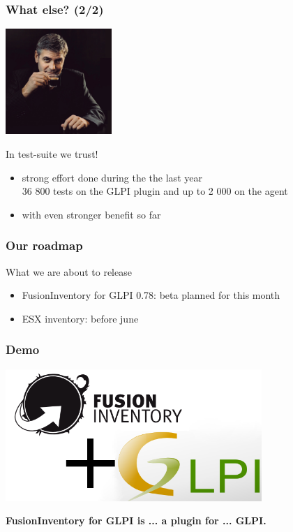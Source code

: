 \documentclass{beamer}
\begin{document}
\begin{frame}
    \frametitle{What else? (2/2)}

    \begin{center}
    \includegraphics[height=4.0cm]{pics/whatelse.jpg}
    \end{center}

    \begin{block}{In test-suite we trust!}
        \begin{itemize}
            \item strong effort done during the the last year \\
            \small{36 800 tests on the GLPI plugin and up to 2 000 on the agent}
            \item with even stronger benefit so far
        \end{itemize}
    \end{block}
\end{frame}

\begin{frame}
    \frametitle{Our roadmap}

    What we are about to release
    \begin{itemize}
    \item FusionInventory for GLPI 0.78: beta planned for this month
    \item ESX inventory: before june
    \end{itemize}
\end{frame}

%
\begin{frame}
    \frametitle{Demo}

   \includegraphics[height=5cm]{./pics/fusinvglpi.png}

    \bf{FusionInventory for GLPI} is ... \pause a plugin for \pause ... \bf{GLPI}.
\end{frame}
\end{document}
